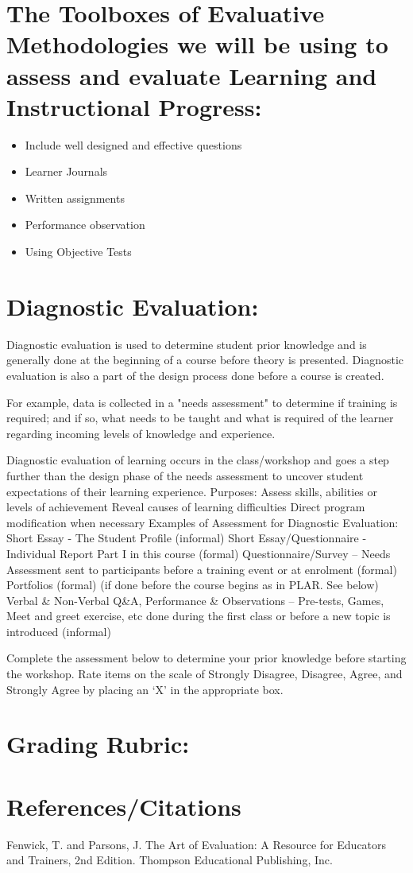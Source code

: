 \section  {The Toolboxes of Evaluative Methodologies we will be using to assess and evaluate Learning and Instructional Progress:}

\begin{itemize}
\item Include well designed and effective questions
\item Learner Journals
\item Written assignments
\item Performance observation
\item Using Objective Tests
\end{itemize}

\section  {Diagnostic Evaluation:}

Diagnostic evaluation is used to determine student prior knowledge and is generally done at the beginning of a course before theory is presented. 
	Diagnostic evaluation is also a part of the design process done before a course is created. 

For example, data is collected in a "needs assessment" to determine if training is required; and if so, what needs to be taught and what is required of the learner regarding incoming levels of knowledge and experience. 

Diagnostic evaluation of learning occurs in the class/workshop and goes a step further than the design phase of the needs assessment to uncover student expectations of their learning experience.
	Purposes:
		Assess skills, abilities or levels of achievement
		Reveal causes of learning difficulties
		Direct program modification when necessary
	Examples of Assessment for Diagnostic Evaluation:
		Short Essay - The Student Profile (informal)
		Short Essay/Questionnaire - Individual Report Part I in this course (formal)
		Questionnaire/Survey – Needs Assessment sent to participants before a training event or at enrolment (formal)
		Portfolios (formal) (if done before the course begins as in PLAR. See below)
		Verbal & Non-Verbal Q&A, Performance & Observations – Pre-tests, Games, Meet and greet exercise, etc done during the first class or before a new topic is introduced (informal)


Complete the assessment below to determine your prior knowledge before starting the workshop.
Rate items on the scale of Strongly Disagree, Disagree, Agree, and Strongly Agree by placing an ‘X’ in the appropriate box.

\section  {Grading Rubric:}


\section  {References/Citations}
Fenwick, T. and Parsons, J. The Art of Evaluation: A Resource for Educators and Trainers, 2nd Edition. Thompson Educational Publishing, Inc.